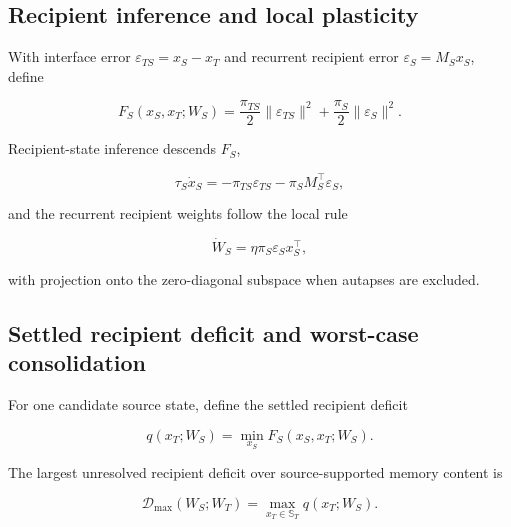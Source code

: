 \documentclass[10pt,letterpaper]{article}
\theoremstyle{plain}
\theoremstyle{remark}
\begin{document}
\subsection{Recipient inference and local plasticity}

With interface error $\varepsilon_{TS}=x_S-x_T$ and recurrent recipient error $\varepsilon_S=M_Sx_S$, define

\begin{equation}
F_S(x_S,x_T;W_S)=\frac{\pi_{TS}}2\|\varepsilon_{TS}\|^2+\frac{\pi_S}{2}\|\varepsilon_S\|^2.
\label{eq:student-energy}
\end{equation}

Recipient-state inference descends $F_S$,

\begin{equation}
\tau_S\dot x_S=-\pi_{TS}\varepsilon_{TS}-\pi_SM_S^\top\varepsilon_S,
\label{eq:student-state}
\end{equation}

and the recurrent recipient weights follow the local rule

\begin{equation}
\dot W_S=\eta\pi_S\varepsilon_Sx_S^\top,
\label{eq:student-learning}
\end{equation}

with projection onto the zero-diagonal subspace when autapses are excluded.


\subsection{Settled recipient deficit and worst-case consolidation}

For one candidate source state, define the settled recipient deficit

\begin{equation}
q(x_T;W_S)=\min_{x_S}F_S(x_S,x_T;W_S).
\label{eq:settled-deficit}
\end{equation}

The largest unresolved recipient deficit over source-supported memory content is

\begin{equation}
\mathcal D_{\max}(W_S;W_T)=\max_{x_T\in\mathbb S_T}q(x_T;W_S).
\label{eq:max-deficit}
\end{equation}
\end{document}
